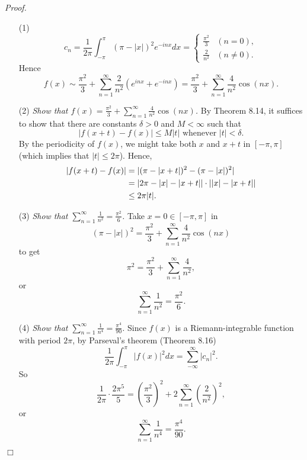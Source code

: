 \documentclass{article}
\begin{document}
\emph{Proof.}
\begin{enumerate}
\item[(1)]
\begin{equation*}
  c_n = \frac{1}{2 \pi} \int_{-\pi}^{\pi} (\pi - |x|)^2 e^{-inx} dx =
    \begin{cases}
      \frac{\pi^2}{3} & (n = 0), \\
      \frac{2}{n^2} & (n \neq 0).
    \end{cases}
\end{equation*}
Hence
\[
  f(x)
  \sim
  \frac{\pi^2}{3} + \sum_{n=1}^{\infty} \frac{2}{n^2}(e^{inx} + e^{-inx})
  =
  \frac{\pi^2}{3} + \sum_{n=1}^{\infty} \frac{4}{n^2} \cos(nx).
\]

\item[(2)]
\emph{Show that $f(x) = \frac{\pi^2}{3} + \sum_{n=1}^{\infty} \frac{4}{n^2} \cos(nx)$.}
By Theorem 8.14,
it suffices to show that there are constants $\delta > 0$ and $M < \infty$ such that
\[
  |f(x+t) - f(x)| \leq M|t| \text{ whenever } |t| < \delta.
\]
By the periodicity of $f(x)$, we might take both $x$ and $x+t$ in $[-\pi,\pi]$
(which implies that $|t| \leq 2\pi$).
Hence,
\begin{align*}
  |f(x+t) - f(x)|
  &= |(\pi-|x+t|)^2 - (\pi-|x|)^2| \\
  &= \abs{ 2\pi-|x|-|x+t| } \cdot \abs{ |x|-|x+t| } \\
  &\leq 2\pi |t|.
\end{align*}

\item[(3)]
\emph{Show that $\sum_{n=1}^{\infty} \frac{1}{n^2} = \frac{\pi^2}{6}$.}
Take $x = 0 \in [-\pi,\pi]$ in
\[
  (\pi-|x|)^2 = \frac{\pi^2}{3} + \sum_{n=1}^{\infty} \frac{4}{n^2} \cos(nx)
\]
to get
\[
  \pi^2 = \frac{\pi^2}{3} + \sum_{n=1}^{\infty} \frac{4}{n^2},
\]
or
\[
  \sum_{n=1}^{\infty} \frac{1}{n^2} = \frac{\pi^2}{6}.
\]

\item[(4)]
\emph{Show that $\sum_{n=1}^{\infty} \frac{1}{n^4} = \frac{\pi^4}{90}$.}
Since $f(x)$ is a Riemann-integrable function with period $2 \pi$,
by Parseval's theorem (Theorem 8.16)
\[
  \frac{1}{2 \pi} \int_{-\pi}^\pi |f(x)|^2 dx = \sum_{-\infty}^{\infty} |c_n|^2.
\]
So
\[
  \frac{1}{2\pi} \cdot \frac{2\pi^5}{5}
  = \left( \frac{\pi^2}{3} \right)^2
    + 2 \sum_{n=1}^{\infty} \left( \frac{2}{n^2} \right)^2,
\]
or
\[
  \sum_{n=1}^{\infty} \frac{1}{n^4} = \frac{\pi^4}{90}.
\]
\end{enumerate}
$\Box$ \\
\end{document}
